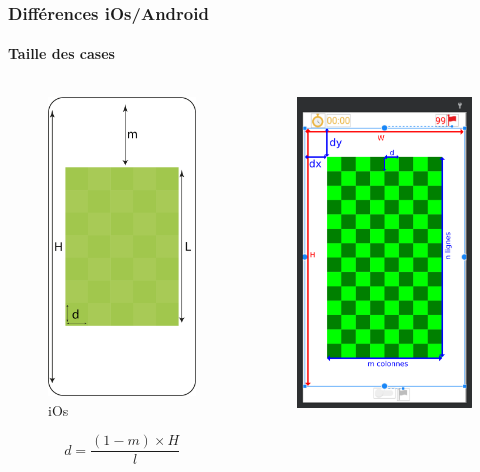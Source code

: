 \documentclass{beamer}
\begin{document}
\begin{frame}
  \frametitle{Différences iOs/Android}
    \framesubtitle{Taille des cases}
    \centering

    \begin{columns}
    \begin{column}{0.4\linewidth}
    \begin{figure}[H]
    \centering
    \includegraphics[width=0.5\linewidth]{Ressources/DimensionCase_iOs.png}
    \caption{iOs}
    \end{figure}
    \tiny
    $$d = \frac {(1 - m)\times H }{l}$$
    \end{column}
    \begin{column}{0.4\linewidth}
    \begin{figure}[H]
                \centering
                \includegraphics[width=0.5\linewidth]{Ressources/androidPositions.png}

\end{figure}
\end{column}
\end{columns}
\end{frame}
\end{document}
